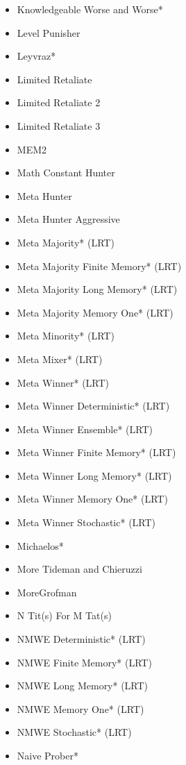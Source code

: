\begin{appendices}
\begin{multicols}{4}
\begin{itemize}
            \item Knowledgeable Worse and Worse*
            \item Level Punisher
            \item Leyvraz*
            \item Limited Retaliate
            \item Limited Retaliate 2
            \item Limited Retaliate 3
            \item MEM2
            \item Math Constant Hunter
            \item Meta Hunter
            \item Meta Hunter Aggressive
            \item Meta Majority* (LRT)
            \item Meta Majority Finite Memory* (LRT)
            \item Meta Majority Long Memory* (LRT)
            \item Meta Majority Memory One* (LRT)
            \item Meta Minority* (LRT)
            \item Meta Mixer* (LRT)
            \item Meta Winner* (LRT)
            \item Meta Winner Deterministic* (LRT)
            \item Meta Winner Ensemble* (LRT)
            \item Meta Winner Finite Memory* (LRT)
            \item Meta Winner Long Memory* (LRT)
            \item Meta Winner Memory One* (LRT)
            \item Meta Winner Stochastic* (LRT)
            \item Michaelos*
            \item More Tideman and Chieruzzi
            \item MoreGrofman
            \item N Tit(s) For M Tat(s)
            \item NMWE Deterministic* (LRT)
            \item NMWE Finite Memory* (LRT)
            \item NMWE Long Memory* (LRT)
            \item NMWE Memory One* (LRT)
            \item NMWE Stochastic* (LRT)
            \item Naive Prober*

\end{itemize}
\end{multicols}
\end{appendices}
